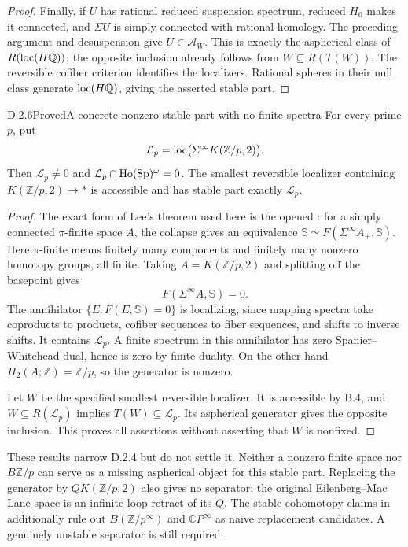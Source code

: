 \begin{proof}
Finally, if $U$ has rational reduced suspension spectrum, reduced
$H_0$ makes it connected, and $\Sigma U$ is simply connected with
rational homology. The preceding argument and desuspension give
$U\in\mathcal A_W$. This is exactly the aspherical class of
$R(\operatorname{loc}(H\mathbb Q))$; the opposite inclusion already follows from
$W\subseteq R(T(W))$. The reversible cofiber criterion identifies
the localizers. Rational spheres in their null class generate
$\operatorname{loc}(H\mathbb Q)$, giving the asserted stable part.
\end{proof}

\begin{claim}{D.2.6}{Proved}{A concrete nonzero stable part with no finite spectra}
For every prime $p$, put
\[
 \mathcal L_p=\operatorname{loc}\bigl(\Sigma^\infty K(\mathbb Z/p,2)\bigr).
\]
Then $\mathcal L_p\ne0$ and
$\mathcal L_p\cap\operatorname{Ho}(\mathrm{Sp})^\omega=0$.
The smallest reversible localizer containing
$K(\mathbb Z/p,2)\to *$ is accessible and has stable part
exactly $\mathcal L_p$.
\end{claim}
\begin{proof}
The exact form of Lee's theorem used here is the opened
\cite[Corollary~1.4.1]{JYuan2024}: for a simply connected $\pi$-finite
space $A$, the collapse gives an equivalence
$\mathbb S\simeq F(\Sigma^\infty A_+,\mathbb S)$.
Here $\pi$-finite means finitely many components and finitely many
nonzero homotopy groups, all finite. Taking $A=K(\mathbb Z/p,2)$
and splitting off the basepoint gives
\[
                  F(\Sigma^\infty A,\mathbb S)=0.
\]
The annihilator $\{E:F(E,\mathbb S)=0\}$ is localizing, since
mapping spectra take coproducts to products, cofiber sequences to
fiber sequences, and shifts to inverse shifts. It contains
$\mathcal L_p$. A finite spectrum in this annihilator has zero
Spanier--Whitehead dual, hence is zero by finite duality.
On the other hand $H_2(A;\mathbb Z)=\mathbb Z/p$, so the generator
is nonzero.

Let $W$ be the specified smallest reversible localizer. It is
accessible by B.4, and $W\subseteq R(\mathcal L_p)$ implies
$T(W)\subseteq\mathcal L_p$. Its aspherical generator gives the
opposite inclusion. This proves all assertions without asserting
that $W$ is nonfixed.
\end{proof}

These results narrow D.2.4 but do not settle it. Neither a nonzero
finite space nor $B\mathbb Z/p$ can serve as a missing aspherical
object for this stable part. Replacing the generator by
$QK(\mathbb Z/p,2)$ also gives no separator: the original
Eilenberg--Mac Lane space is an infinite-loop retract of its $Q$.
The stable-cohomotopy claims in
\cite[Section~10.12 and Lemma~10.13]{EH5Bousfield1997} additionally
rule out $B(\mathbb Z/p^\infty)$ and $\mathbb CP^\infty$ as naive
replacement candidates. A genuinely unstable separator is still
required.
